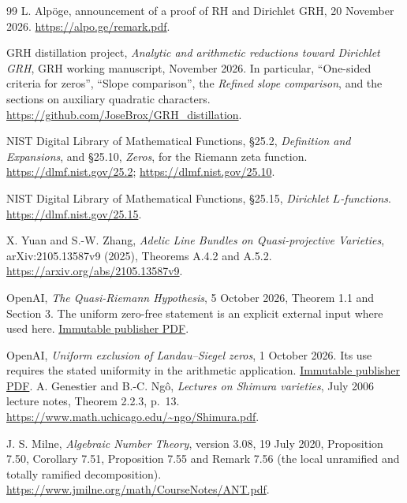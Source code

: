 \begin{thebibliography}{99}
\small
{}
L. Alp\"oge, announcement of a proof of RH and Dirichlet GRH,
20 November 2026. \url{https://alpo.ge/remark.pdf}.

GRH distillation project, \emph{Analytic and arithmetic reductions
toward Dirichlet GRH}, GRH working manuscript, November 2026.
In particular, ``One-sided criteria for zeros'', ``Slope comparison'',
the \emph{Refined slope comparison}, and the sections on auxiliary
quadratic characters.
\url{https://github.com/JoseBrox/GRH_distillation}.

NIST Digital Library of Mathematical Functions,
\S25.2, \emph{Definition and Expansions}, and
\S25.10, \emph{Zeros}, for the Riemann zeta function.
\url{https://dlmf.nist.gov/25.2};
\url{https://dlmf.nist.gov/25.10}.

NIST Digital Library of Mathematical Functions,
\S25.15, \emph{Dirichlet $L$-functions}.
\url{https://dlmf.nist.gov/25.15}.

X. Yuan and S.-W. Zhang, \emph{Adelic Line Bundles on
Quasi-projective Varieties}, arXiv:2105.13587v9 (2025),
Theorems A.4.2 and A.5.2.
\url{https://arxiv.org/abs/2105.13587v9}.

OpenAI, \emph{The Quasi-Riemann Hypothesis}, 5 October 2026,
Theorem 1.1 and Section 3. The uniform zero-free statement is an
explicit external input where used here.
\href{https://github.com/openai/math/blob/4eaee87548250b2682affda7d05d947c05554bae/preprints/The-Quasi-Riemann-Hypothesis-October-5-2026/paper2.pdf}{Immutable publisher PDF}.

OpenAI, \emph{Uniform exclusion of Landau--Siegel zeros},
1 October 2026. Its use requires the stated uniformity in the
arithmetic application.
\href{https://github.com/openai/math/blob/4eaee87548250b2682affda7d05d947c05554bae/preprints/Uniform-exclusion-of-Landau-Siegel-zeros-October-1-2026/paper.pdf}{Immutable publisher PDF}.
A. Genestier and B.-C. Ng\^o, \emph{Lectures on Shimura varieties},
July 2006 lecture notes, Theorem 2.2.3, p.\ 13.
\url{https://www.math.uchicago.edu/~ngo/Shimura.pdf}.

J. S. Milne, \emph{Algebraic Number Theory}, version 3.08,
19 July 2020, Proposition 7.50, Corollary 7.51, Proposition 7.55
and Remark 7.56 (the local unramified and totally ramified decomposition).
\url{https://www.jmilne.org/math/CourseNotes/ANT.pdf}.


\end{thebibliography}
